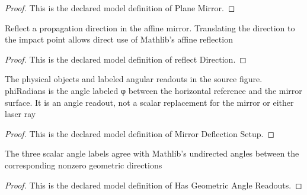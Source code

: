 \begin{proof}
  This is the declared model definition of Plane Mirror.
\end{proof}
\begin{definition}
  \label{def:physics:phyx-mini-0060:phyxminiproblems-problemphyxmini0060-planemirror-reflectdirection}
  Reflect a propagation direction in the affine mirror. Translating the direction to the impact point allows direct use of Mathlib's affine reflection
\end{definition}
\begin{proof}
  This is the declared model definition of reflect Direction.
\end{proof}
\begin{definition}
  \label{def:physics:phyx-mini-0060:phyxminiproblems-problemphyxmini0060-mirrordeflectionsetup}
  The physical objects and labeled angular readouts in the source figure. phiRadians is the angle labeled φ between the horizontal reference and the mirror surface. It is an angle readout, not a scalar replacement for the mirror or either laser ray
\end{definition}
\begin{proof}
  This is the declared model definition of Mirror Deflection Setup.
\end{proof}
\begin{definition}
  \label{def:physics:phyx-mini-0060:phyxminiproblems-problemphyxmini0060-hasgeometricanglereadouts}
  The three scalar angle labels agree with Mathlib's undirected angles between the corresponding nonzero geometric directions
\end{definition}
\begin{proof}
  This is the declared model definition of Has Geometric Angle Readouts.
\end{proof}

